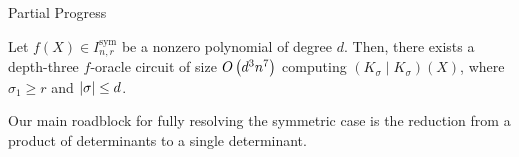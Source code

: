 \documentclass[aspectratio=169]{beamer}
\newcommand{\svdots}{\raisebox{-0.12\height}[0pt][0pt]{$\vdots$}}
\DeclareMathOperator{\sym}{sym}
\begin{document}
%

\begin{frame}{Partial Progress}
  \begin{thrm}
    Let $f(X) \in I^{\sym}_{n, r}$ be a nonzero polynomial of degree $d$.
    Then, there exists a depth-three $f$-oracle circuit of size $O\kern-0.0pt\left(d^3 n^7\right)$ computing $(K_\sigma \mid K_\sigma)(X)$, where $\sigma_1 \geq r$ and $\abs{\sigma} \leq d$.
  \end{thrm}

  \pause
  \vspace{10pt}

  Our main roadblock for fully resolving the symmetric case is the reduction from a product of determinants to a single determinant.
\end{frame}
\end{document}
